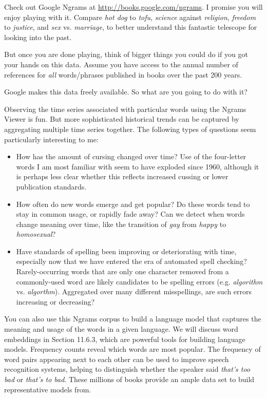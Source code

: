 \documentclass[10pt]{article}
\begin{document}
Check out Google Ngrams at \href{http://books.google.com/ngrams}{http://books.google.com/ngrams}. I promise you will enjoy playing with it. Compare \textit{hot dog} to \textit{tofu}, \textit{science} against \textit{religion}, \textit{freedom} to \textit{justice}, and \textit{sex} vs. \textit{marriage}, to better understand this fantastic telescope for looking into the past.

But once you are done playing, think of bigger things you could do if you got your hands on this data. Assume you have access to the annual number of references for \textit{all} words/phrases published in books over the past 200 years.

Google makes this data freely available. So what are you going to do with it?

Observing the time series associated with particular words using the Ngrams Viewer is fun. But more sophisticated historical trends can be captured by aggregating multiple time series together. The following types of questions seem particularly interesting to me:

\begin{itemize}
  \item How has the amount of cursing changed over time? Use of the four-letter words I am most familiar with seem to have exploded since 1960, although it is perhaps less clear whether this reflects increased cussing or lower publication standards.
  \item How often do new words emerge and get popular? Do these words tend to stay in common usage, or rapidly fade away? Can we detect when words change meaning over time, like the transition of \textit{gay} from \textit{happy} to \textit{homosexual}?
  \item Have standards of spelling been improving or deteriorating with time, especially now that we have entered the era of automated spell checking? Rarely-occurring words that are only one character removed from a commonly-used word are likely candidates to be spelling errors (e.g. \textit{algorithm} vs. \textit{algorthm}). Aggregated over many different misspellings, are such errors increasing or decreasing?
\end{itemize}

You can also use this Ngrams corpus to build a language model that captures the meaning and usage of the words in a given language. We will discuss word embeddings in Section 11.6.3, which are powerful tools for building language models. Frequency counts reveal which words are most popular. The frequency of word pairs appearing next to each other can be used to improve speech recognition systems, helping to distinguish whether the speaker said \textit{that's too bad} or \textit{that's to bad}. These millions of books provide an ample data set to build representative models from.
\end{document}
